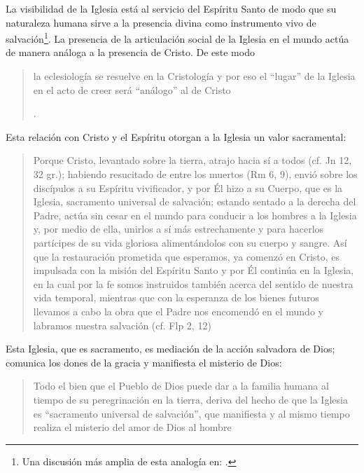 La visibilidad de la Iglesia está al servicio del Espíritu Santo de modo que su naturaleza humana sirve a la presencia divina como instrumento vivo de salvación\footnote{Una discusión más amplia de esta analogía en: \cite[292-297]{ninot2009tf}.}. La presencia de la articulación social de la Iglesia en el mundo actúa de manera análoga a la presencia de Cristo. De este modo \blockquote[{\Cite[566]{ninot2009tf}}.]{la eclesiología se resuelve en la Cristología y por eso el ``lugar'' de la Iglesia en el acto de creer será ``análogo'' al de Cristo}. Esta relación con Cristo y el Espíritu otorgan a la Iglesia un valor sacramental: \blockquote[][\,(LG 48)]{Porque Cristo, levantado sobre la tierra, atrajo hacia sí a todos (cf. Jn 12, 32 gr.); habiendo resucitado de entre los muertos (Rm 6, 9), envió sobre los discípulos a su Espíritu vivificador, y por Él hizo a su Cuerpo, que es la Iglesia, sacramento universal de salvación; estando sentado a la derecha del Padre, actúa sin cesar en el mundo para conducir a los hombres a la Iglesia y, por medio de ella, unirlos a sí más estrechamente y para hacerlos partícipes de su vida gloriosa alimentándolos con su cuerpo y sangre. Así que la restauración prometida que esperamos, ya comenzó en Cristo, es impulsada con la misión del Espíritu Santo y por Él continúa en la Iglesia, en la cual por la fe somos instruidos también acerca del sentido de nuestra vida temporal, mientras que con la esperanza de los bienes futuros llevamos a cabo la obra que el Padre nos encomendó en el mundo y labramos nuestra salvación (cf. Flp 2, 12)}. Esta Iglesia, que es sacramento, es mediación de la acción salvadora de Dios; comunica los dones de la gracia y manifiesta el misterio de Dios: \blockquote[][\,(GS 45)]{Todo el bien que el Pueblo de Dios puede dar a la familia humana al tiempo de su peregrinación en la tierra, deriva del hecho de que la Iglesia es ``sacramento universal de salvación'', que manifiesta y al mismo tiempo realiza el misterio del amor de Dios al hombre}.


